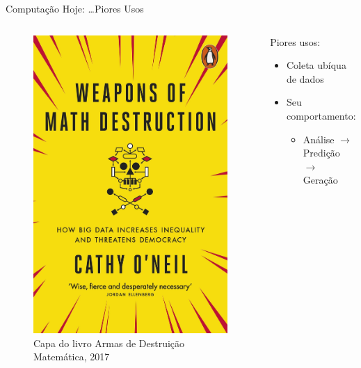 \documentclass[10pt, compress, aspectratio=169, xcolor={table,usenames,dvipsnames}]{beamer}
\begin{document}
\begin{frame}[label={sec:orge866d75}]{Computação Hoje: \dots{}Piores Usos}
\begin{columns}
\begin{column}{0.5\columnwidth}
\begin{figure}[htbp]
\centering
\includegraphics[height=.8\textheight]{../../../img/wmd_cover.jpg}
\caption{Capa do livro \alert{Armas de Destruição Matemática}, 2017}
\end{figure}
\end{column}
\begin{column}{0.5\columnwidth}
\alert{Piores} usos:
\begin{itemize}
\item \alert{Coleta ubíqua} de dados
\item Seu \alert{comportamento}:
\begin{itemize}
\item \alert{Análise} \(\rightarrow\) \alert{Predição} \(\rightarrow\) \alert{Geração}
\end{itemize}
\end{itemize}


\end{column}
\end{columns}
\end{frame}
\end{document}
